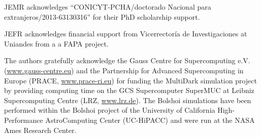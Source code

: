 \documentclass{emulateapj}
\providecommand{\DIFaddend}{} %
\begin{document}
\DIFaddend JEMR acknowledges ``CONICYT-PCHA/doctorado Nacional para
extranjeros/2013-63130316'' for their PhD scholarship support.  

JEFR acknowledges financial support from Vicerrector\'ia de
Investigaciones at Uniandes from a a FAPA project.

The authors gratefully acknowledge the Gauss Centre for Supercomputing
e.V. (\url{www.gauss-centre.eu}) and the Partnership for Advanced
Supercomputing in Europe (PRACE, \url{www.prace-ri.eu}) for funding the
MultiDark simulation project by providing computing time on the GCS
Supercomputer SuperMUC at Leibniz Supercomputing Centre (LRZ,
\url{www.lrz.de}). The Bolshoi simulations have been performed within the
Bolshoi project of the University of California High-Performance
AstroComputing Center (UC-HiPACC) and were run at the NASA Ames
Research Center. 
\end{document}
